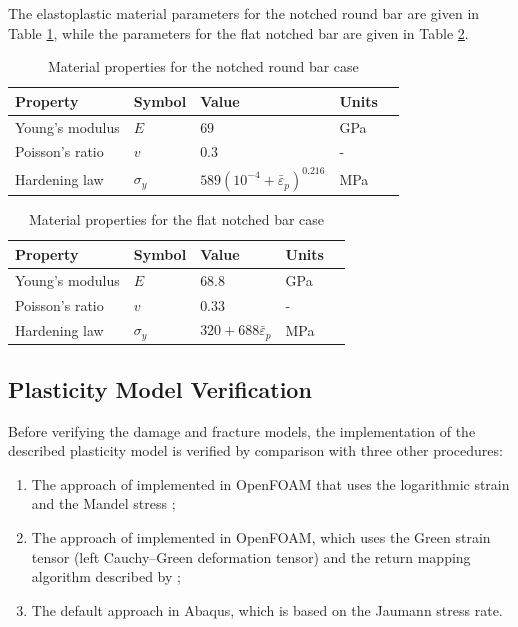 \documentclass[sn-mathphys,Numbered,draft]{sn-jnl}%
\begin{document}
The elastoplastic material parameters for the notched round bar are given in Table \ref{tab:notched_bar_mat}, while the parameters for the flat notched bar are given in Table \ref{tab:flat_bar_mat}.
\begin{table}[htb]
	\centering
		\begin{tabular}{lllll} \hline
			Property & Symbol & Value  & Units \\ \hline 
			Young's modulus & $E$ & $69$ & GPa \\
			Poisson's ratio & $v$ & $0.3$  & - \\
			Hardening law & $\sigma_y$ & $589({10^{-4}+\bar{\varepsilon}}_p)^{0.216}$ & MPa  \\
			\hline
		\end{tabular}
	\caption{Material properties for the notched round bar case}
	\label{tab:notched_bar_mat}
\end{table}
\begin{table}[htb]
	\centering
		\begin{tabular}{lllll} \hline
			Property & Symbol & Value & Units  \\ \hline 
			Young's modulus & $E$ & $68.8$ & GPa \\
			Poisson's ratio & $v$ & $0.33$   & -\\
			Hardening law & $\sigma_y$ & $320+688\bar{\varepsilon}_p$ & MPa  \\
			\hline
		\end{tabular}
	\caption{Material properties for the flat notched bar case}
	\label{tab:flat_bar_mat}
\end{table}



\subsection{Plasticity Model Verification} \label{PlasticityTestCases}

Before verifying the damage and fracture models, the implementation of the described plasticity model is verified by comparison with three other procedures:
\begin{enumerate}[label=(\alph*)]
	\item The approach of \citet{clancy_improving_2019} implemented in OpenFOAM that uses the logarithmic strain and the Mandel stress \cite{caminero_modeling_2011};
	\item The approach of \citet{cardiff_lagrangian_2017} implemented in OpenFOAM, which uses the Green strain tensor (left Cauchy–Green deformation tensor) and the return mapping algorithm described by \citet{simo_computational_1998};
	\item The default approach in Abaqus, which is based on the Jaumann stress rate.
\end{enumerate}
\end{document}
